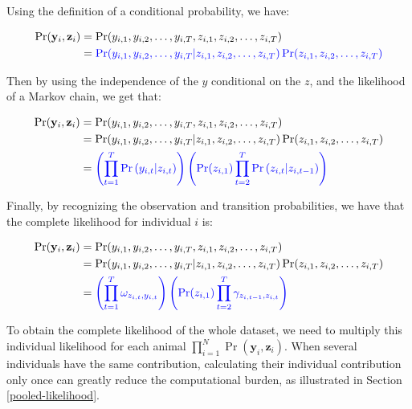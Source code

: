 \documentclass[
  12pt,
]{krantz}
\begin{document}
Using the definition of a conditional probability, we have:

\begin{align*}
\Pr(\mathbf{y}_i, \mathbf{z}_i) &= \Pr(y_{i,1}, y_{i,2}, \ldots, y_{i,T}, z_{i,1}, z_{i,2}, \ldots, z_{i,T})\\
                  &= \color{blue}{\Pr(y_{i,1}, y_{i,2}, \ldots, y_{i,T} | z_{i,1}, z_{i,2}, \ldots, z_{i,T}) \Pr(z_{i,1}, z_{i,2}, \ldots, z_{i,T})}\\
\end{align*}

Then by using the independence of the \(y\) conditional on the \(z\), and the likelihood of a Markov chain, we get that:

\begin{align*}
\Pr(\mathbf{y}_i, \mathbf{z}_i) &= \Pr(y_{i,1}, y_{i,2}, \ldots, y_{i,T}, z_{i,1}, z_{i,2}, \ldots, z_{i,T})\\
                  &= \Pr(y_{i,1}, y_{i,2}, \ldots, y_{i,T} | z_{i,1}, z_{i,2}, \ldots, z_{i,T}) \Pr(z_{i,1}, z_{i,2}, \ldots, z_{i,T})\\
                &= \color{blue}{\left(\prod_{t=1}^T{\Pr{(y_{i,t} | z_{i,t})}}\right) \left(\Pr(z_{i,1}) \prod_{t=2}^T{\Pr{(z_{i,t} | z_{i,t-1})}}\right)}\\
\end{align*}

Finally, by recognizing the observation and transition probabilities, we have that the complete likelihood for individual \(i\) is:

\begin{align*}
\Pr(\mathbf{y}_i, \mathbf{z}_i) &= \Pr(y_{i,1}, y_{i,2}, \ldots, y_{i,T}, z_{i,1}, z_{i,2}, \ldots, z_{i,T})\\
                  &= \Pr(y_{i,1}, y_{i,2}, \ldots, y_{i,T} | z_{i,1}, z_{i,2}, \ldots, z_{i,T}) \Pr(z_{i,1}, z_{i,2}, \ldots, z_{i,T})\\
                &= \color{blue}{\left(\prod_{t=1}^T{\omega_{z_{i,t}, y_{i,t}}}\right) \left(\Pr(z_{i,1}) \prod_{t=2}^T{\gamma_{z_{i,t-1},z_{i,t}}}\right)}\\
\end{align*}

To obtain the complete likelihood of the whole dataset, we need to multiply this individual likelihood for each animal \(\displaystyle{\prod_{i=1}^N{\Pr(\mathbf{y}_i,\mathbf{z}_i)}}\). When several individuals have the same contribution, calculating their individual contribution only once can greatly reduce the computational burden, as illustrated in Section \ref{pooled-likelihood}.
\end{document}
